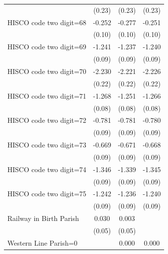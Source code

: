 {\begin{tabular}{l*{3}{c}}
                    &      (0.23)         &      (0.23)         &      (0.23)         \\
HISCO code two digit=68&      -0.252\sym{***}&      -0.277\sym{***}&      -0.251\sym{***}\\
                    &      (0.10)         &      (0.10)         &      (0.10)         \\
HISCO code two digit=69&      -1.241\sym{***}&      -1.237\sym{***}&      -1.240\sym{***}\\
                    &      (0.09)         &      (0.09)         &      (0.09)         \\
HISCO code two digit=70&      -2.230\sym{***}&      -2.221\sym{***}&      -2.226\sym{***}\\
                    &      (0.22)         &      (0.22)         &      (0.22)         \\
HISCO code two digit=71&      -1.268\sym{***}&      -1.251\sym{***}&      -1.266\sym{***}\\
                    &      (0.08)         &      (0.08)         &      (0.08)         \\
HISCO code two digit=72&      -0.781\sym{***}&      -0.781\sym{***}&      -0.780\sym{***}\\
                    &      (0.09)         &      (0.09)         &      (0.09)         \\
HISCO code two digit=73&      -0.669\sym{***}&      -0.671\sym{***}&      -0.668\sym{***}\\
                    &      (0.09)         &      (0.09)         &      (0.09)         \\
HISCO code two digit=74&      -1.346\sym{***}&      -1.339\sym{***}&      -1.345\sym{***}\\
                    &      (0.09)         &      (0.09)         &      (0.09)         \\
HISCO code two digit=75&      -1.242\sym{***}&      -1.236\sym{***}&      -1.240\sym{***}\\
                    &      (0.09)         &      (0.09)         &      (0.09)         \\
Railway in Birth Parish&       0.030         &       0.003         &                     \\
                    &      (0.05)         &      (0.05)         &                     \\
Western Line Parish=0&                     &       0.000         &       0.000         \\

\end{tabular}}
